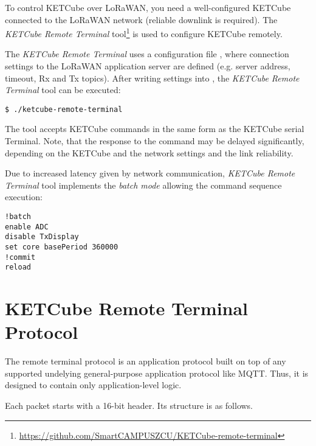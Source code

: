To control KETCube over LoRaWAN, you need a well-configured KETCube connected to the LoRaWAN network (reliable downlink is required). The {\it KETCube Remote Terminal} tool\footnote{\url{https://github.com/SmartCAMPUSZCU/KETCube-remote-terminal}} is used to configure KETCube remotely.

The {\it KETCube Remote Terminal} uses a configuration file , where connection settings to the LoRaWAN application server are defined (e.g. server address, timeout, Rx and Tx topics). After writing settings into , the {\it KETCube Remote Terminal} tool can be executed:

\begin{Verbatim}[frame=single, fontsize=\small]
$ ./ketcube-remote-terminal
\end{Verbatim}

The tool accepts KETCube commands in the same form as the KETCube serial Terminal. Note, that the response to the command may be delayed significantly, depending on the KETCube and the network settings and the link reliability. 

Due to increased latency given by network communication, {\it KETCube Remote Terminal} tool implements the {\it batch mode} allowing the command sequence execution:

\begin{Verbatim}[frame=single, fontsize=\small]
!batch
enable ADC
disable TxDisplay
set core basePeriod 360000
!commit
reload
\end{Verbatim}


\clearpage 
\section{KETCube Remote Terminal Protocol}

The remote terminal protocol is an application protocol built on top of any supported undelying general-purpose application protocol like MQTT. Thus, it is designed to contain only application-level logic.


\noindent Each packet starts with a 16-bit header. Its structure is as follows.

